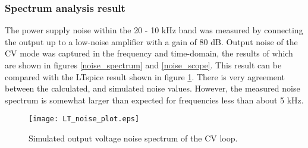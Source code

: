 \documentclass[a4paper,10pt, oneside]{article}
\begin{document}
\subsubsection*{Spectrum analysis result}
The power supply noise within the 20 - 10 kHz band was measured by connecting the output up to a low-noise amplifier with a gain of 80 dB. Output noise of the CV mode was captured in the frequency and time-domain, the results of which are shown in figures \ref{noise_spectrum} and \ref{noise_scope}. This result can be compared with the LTspice result shown in figure \ref{noise_sim}. There is very agreement between the calculated, and simulated noise values. However, the measured noise spectrum is somewhat larger than expected for frequencies less than about 5 kHz. 
\begin{figure}[H]
	\hspace*{-0.5cm}
	\begin{centering}
		\texttt{[image: LT\_noise\_plot.eps]}
		\caption{Simulated output voltage noise spectrum of the CV loop.}\label{noise_sim}
	\end{centering}
\end{figure}
\end{document}
